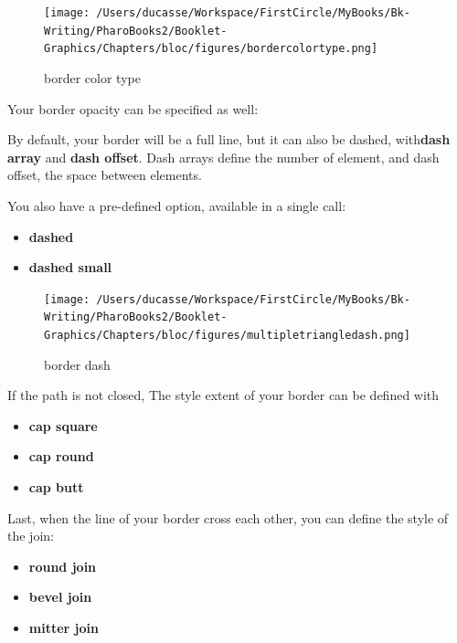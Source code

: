 \documentclass[10pt,twoside,english]{_support/latex/sbabook/sbabook}
\begin{document}
\begin{figure}[htpb]
\begin{center}
\texttt{[image: /Users/ducasse/Workspace/FirstCircle/MyBooks/Bk-Writing/PharoBooks2/Booklet-Graphics/Chapters/bloc/figures/bordercolortype.png]}
\caption{border color type}
\end{center}
\end{figure}


Your border opacity can be specified as well: 

By default, your border will be a full line, but it can also be dashed, with\textbf{dash array} and \textbf{dash offset}. Dash arrays define the number of element, and
dash offset, the space between elements.

You also have a pre-defined option, available in a single call:

\begin{itemize}
    \item \textbf{dashed}
    \item \textbf{dashed small}
\end{itemize}

\begin{figure}[htpb]
\begin{center}
\texttt{[image: /Users/ducasse/Workspace/FirstCircle/MyBooks/Bk-Writing/PharoBooks2/Booklet-Graphics/Chapters/bloc/figures/multipletriangledash.png]}
\caption{border dash}
\end{center}
\end{figure}


If the path is not closed, The style extent of your border can be defined with

\begin{itemize}
    \item \textbf{cap square}
    \item \textbf{cap round}
    \item \textbf{cap butt}
\end{itemize}

Last, when the line of your border cross each other, you can define the style of
the join:

\begin{itemize}
    \item \textbf{round join}
    \item \textbf{bevel join}
    \item \textbf{mitter join}
\end{itemize}
\end{document}
